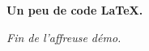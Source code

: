 \begin{bdocshowcase}
    \bfseries Un peu de code \LaTeX.

    \bigskip

    \emph{\large Fin de l'affreuse démo.}
\end{bdocshowcase}
